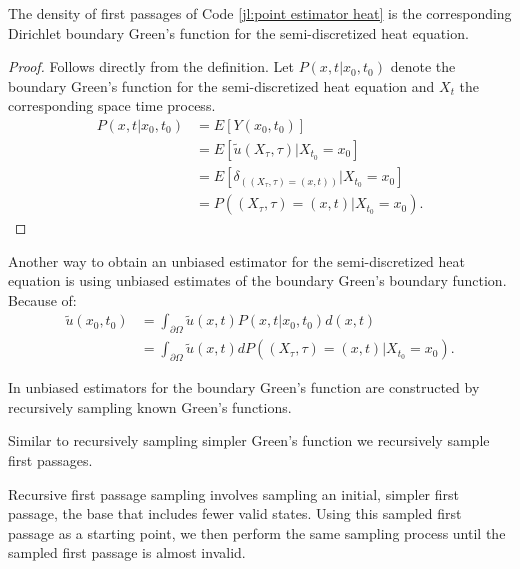 \documentclass[a4paper,12pt]{article}
\begin{document}
\begin{theorem}
  The density of first passages of Code \ref{jl:point estimator heat} is the
  corresponding Dirichlet boundary Green's function for the semi-discretized heat equation.
\end{theorem}

\begin{proof}
  Follows directly from the definition.
  Let $P(x,t|x_{0},t_{0})$ denote the boundary Green's
  function for the semi-discretized heat equation and $X_{t}$
  the corresponding space time process.
  \begin{align}
    P(x,t|x_{0},t_{0}) & = E[Y(x_0,t_0)]                                         \\
                       & = E[\tilde{u}(X_{\tau},\tau) | X_{t_0} = x_0 ]          \\
                       & = E[\delta_{((X_{\tau},\tau) = (x,t))}| X_{t_0} = x_0 ] \\
                       & = P((X_{\tau},\tau) = (x,t)| X_{t_0} = x_0 )
    .
  \end{align}
\end{proof}


Another way to obtain an unbiased estimator for the semi-discretized heat equation is using unbiased estimates
of the boundary Green's boundary function. Because of:
\begin{align}
  \tilde{u}(x_{0},t_{0}) & = \int_{\partial \Omega} \tilde{u}(x,t) P(x,t|x_{0},t_{0}) d(x,t)                    \\
                         & = \int_{\partial \Omega} \tilde{u}(x,t)  dP((X_{\tau},\tau) = (x,t)| X_{t_0} = x_0 )
  .
\end{align}

\begin{related}
  In \cite{qi_bidirectional_2022} unbiased estimators for the boundary Green's function are constructed
  by recursively sampling known Green's functions.
\end{related}

Similar to recursively  sampling simpler Green's function we recursively sample first passages.

\begin{technique}
  Recursive first passage sampling involves sampling an initial,
  simpler first passage, the base that includes fewer valid states. Using
  this sampled first passage as a starting point, we
  then perform the same sampling process until the sampled
  first passage is almost invalid.
\end{technique}
\end{document}
